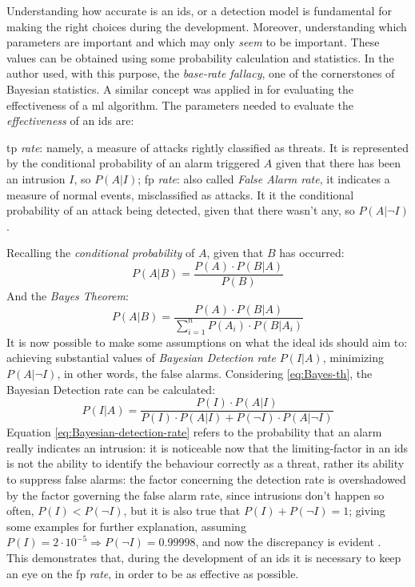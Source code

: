 Understanding how accurate is an \gls{ids}, or a detection model is fundamental for making the right choices during the development. Moreover, understanding which parameters are important and which may only \textit{seem} to be important. These values can be obtained using some probability calculation and statistics. In \cite{Axelsson2000} the author used, with this purpose, the \textit{base-rate fallacy}, one of the cornerstones of Bayesian statistics. A similar concept was applied in \cite{Liu2019} for evaluating the effectiveness of a \gls{ml} algorithm. The parameters needed to evaluate the \textit{effectiveness} of an \gls{ids} are:
\begin{itemize}
    \itemAR \gls{tp} \textit{rate}: namely, a measure of attacks rightly classified as threats. It is represented by the conditional probability of an alarm triggered $A$ given that there has been an intrusion $I$, so $P(A|I)$;
    \itemAR \gls{fp} \textit{rate}: also called \textit{False Alarm rate}, it indicates a measure of normal events, misclassified as attacks. It it the conditional probability of an attack being detected, given that there wasn't any, so $P(A|\neg I)$.
\end{itemize}
Recalling the \textit{conditional probability} of $A$, given that $B$ has occurred:
\begin{equation}
    P(A|B)=\frac{P(A)\cdot P(B|A)}{P(B)}
    \label{eq:conditional-prob}
\end{equation}
And the \textit{Bayes Theorem}:
\begin{equation}
    P(A|B)=\frac{P(A)\cdot P(B|A)}{\sum_{i=1}^nP(A_i)\cdot P(B|A_i)}
    \label{eq:Bayes-th}
\end{equation}
It is now possible to make some assumptions on what the ideal \gls{ids} should aim to: achieving substantial values of \textit{Bayesian Detection rate} $P(I|A)$, minimizing $P(A|\neg I)$, in other words, the false alarms. Considering \ref{eq:Bayes-th}, the Bayesian Detection rate can be calculated:
\begin{equation}
    P(I|A)=\frac{P(I)\cdot P(A|I)}{P(I)\cdot P(A|I)+ P(\neg I)\cdot P(A|\neg I)}
    \label{eq:Bayesian-detection-rate}
\end{equation}
Equation \ref{eq:Bayesian-detection-rate} refers to the probability that an alarm really indicates an intrusion: it is noticeable now that the limiting-factor in an \gls{ids} is not the ability to identify the behaviour correctly as a threat, rather its ability to suppress false alarms: the factor concerning the detection rate is overshadowed by the factor governing the false alarm rate, since intrusions don't happen so often, $P(I)<P(\neg I)$, but it is also true that $P(I)+P(\neg I)=1$; giving some examples for further explanation, assuming $P(I)=2\cdot 10^{-5}\Rightarrow P(\neg I)=0.99998$, and now the discrepancy is evident \cite{Axelsson2000}. \\ This demonstrates that, during the development of an \gls{ids} it is necessary to keep an eye on the \gls{fp} \textit{rate}, in order to be as effective as possible.

